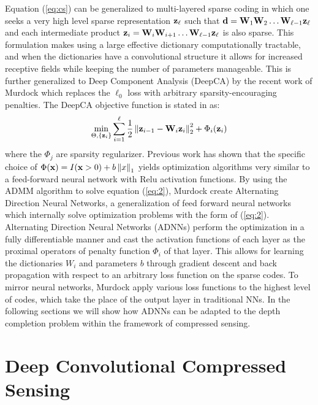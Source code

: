 Equation (\ref{eq:cs}) can be generalized to multi-layered sparse coding in which one seeks a very high level sparse representation $\mathbf{z}_{\ell}$ such that $\mathbf{d} = \mathbf{W}_1\mathbf{W}_2\ldots \mathbf{W}_{\ell-1}\mathbf{z}_{\ell}$ and each intermediate product $\mathbf{z}_i = \mathbf{W}_i\mathbf{W}_{i+1}\ldots \mathbf{W}_{\ell-1}\mathbf{z}_{\ell}$ is also sparse. This formulation makes using a large effective dictionary computationally tractable, and when the dictionaries have a convolutional structure it allows for increased receptive fields while keeping the number of parameters manageable. This is further generalized to Deep Component Analysis (DeepCA) by the recent work of Murdock \etal which replaces the $\ell_0$ loss with arbitrary sparsity-encouraging penalties. The DeepCA objective function is stated in \cite{murdock} as:
\begin{equation}
  \label{eq:2}
  \min_{\Theta, \{\mathbf{z}_i\}} \sum_{i=1}^{\ell} \frac{1}{2} \left\Vert \mathbf{z}_{i-1} - \mathbf{W}_i\mathbf{z}_i\right\Vert_2^2 + \Phi_i(\mathbf{z}_i)
\end{equation}
where the $\Phi_j$ are sparsity regularizer. Previous work has shown that the specific choice of $\Phi(\mathbf{x}) = I(\mathbf{x} > 0) + b\left\Vert x\right\Vert_1$ yields optimization algorithms very similar to a feed-forward neural network with Relu activation functions. By using the ADMM algorithm to solve equation (\ref{eq:2}), Murdock \etal create Alternating Direction Neural Networks, a generalization of feed forward neural networks which internally solve optimization problems with the form of (\ref{eq:2}). Alternating Direction Neural Networks (ADNNs) perform the optimization in a fully differentiable manner and cast the activation functions of each layer as the proximal operators of penalty function $\Phi_i$ of that layer. This allows for learning the dictionaries $W_i$ and parameters $b$ through gradient descent and back propagation with respect to an arbitrary loss function on the sparse codes. To mirror neural networks, Murdock \etal apply various loss functions to the highest level of codes, which take the place of the output layer in traditional NNs. In the following sections we will show how ADNNs can be adapted to the depth completion problem within the framework of compressed sensing.\\

\section{Deep Convolutional Compressed Sensing}
\label{sec:dccs}


